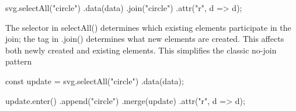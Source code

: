 \documentclass{report}
\begin{document}
\begin{itemize}
\begin{jscode}
                svg.selectAll("circle")
                    .data(data)
                    .join("circle")
                    .attr("r", d => d);
            \end{jscode}
            \bigbreak \noindent 
            The selector in selectAll() determines which existing elements participate in the join; the tag in .join() determines what new elements are created.
            \bigbreak \noindent 
            This affects both newly created and existing elements. This simplifies the classic no-join pattern
            \bigbreak \noindent 
            \begin{jscode}
                const update = svg.selectAll("circle") .data(data);

                update.enter()
                    .append("circle")
                    .merge(update)
                    .attr("r", d => d);


\end{jscode}
\end{itemize}
\end{document}
